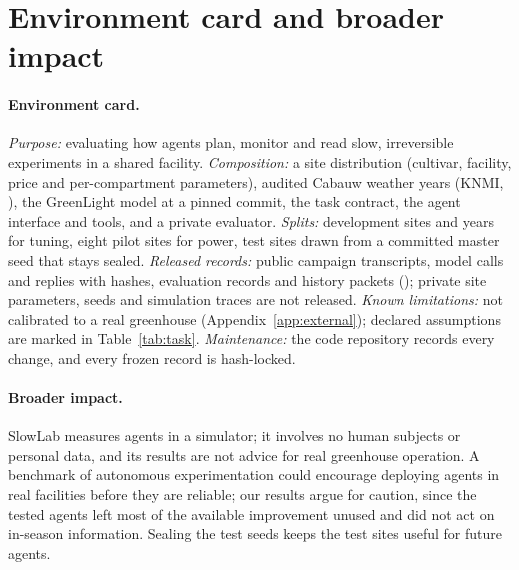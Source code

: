 \section{Environment card and broader impact}
\label{app:card}
\paragraph{Environment card.} \emph{Purpose:} evaluating how agents plan, monitor and read slow, irreversible experiments in a shared facility. \emph{Composition:} a site distribution (cultivar, facility, price and per-compartment parameters), audited Cabauw weather years (KNMI, \ccby{}), the GreenLight model at a pinned commit, the task contract, the agent interface and tools, and a private evaluator. \emph{Splits:} development sites and years for tuning, eight pilot sites for power,  test sites drawn from a committed master seed that stays sealed. \emph{Released records:} public campaign transcripts, model calls and replies with hashes, evaluation records and history packets (\ccby{}); private site parameters, seeds and simulation traces are not released. \emph{Known limitations:} not calibrated to a real greenhouse (Appendix~\ref{app:external}); declared assumptions are marked in Table~\ref{tab:task}. \emph{Maintenance:} the code repository records every change, and every frozen record is hash-locked.
\paragraph{Broader impact.} SlowLab measures agents in a simulator; it involves no human subjects or personal data, and its results are not advice for real greenhouse operation. A benchmark of autonomous experimentation could encourage deploying agents in real facilities before they are reliable; our results argue for caution, since the tested agents left most of the available improvement unused and did not act on in-season information. Sealing the test seeds keeps the test sites useful for future agents.

